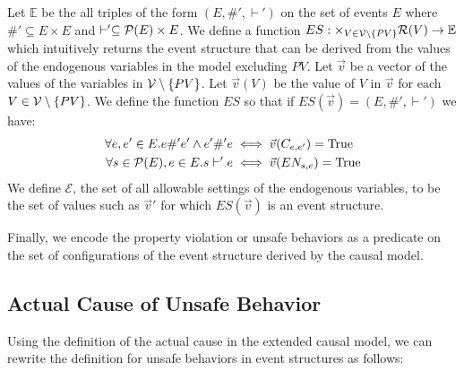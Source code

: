 Let $\mathbb{E}$ be the all triples of the form
$(E,\#',\vdash')$ on the set of events $E$ where
$\#' \subseteq E \times E$ and
$\vdash' \subseteq \mathcal{P}(E) \times E$.
We define a function
$ES: \times_{V \in \mathcal{V}\setminus \{PV\}} \mathcal{R}(V) \rightarrow \mathbb{E}$ which intuitively returns the event structure
that can be derived from the values of the endogenous variables
in the model excluding $PV$.
Let $\vec v$ be a vector of the values of the variables
in $\mathcal{V} \setminus \{PV\}$.
Let $\vec v(V)$ be the value of $V$ in $\vec v$ for each
$V \in \mathcal{V} \setminus \{PV\}$.
We define the function $ES$ so that if
$ES(\vec v) = (E,\#',\vdash')$ we have:
\begin{align*}
    \forall e,e' \in E. e \#' e' \wedge e' \#' e
     & \iff \vec{v}(C_{e,e'}) = \mathrm{True} \\
    \forall s \in \mathcal{P}(E), e \in E.  s \vdash' e
     & \iff \vec{v}(EN_{s,e}) = \mathrm{True}
\end{align*}
We define $\mathcal{E}$, the set of all allowable
settings of the endogenous variables, to be the set of
values such as $\vec v'$ for which $ES(\vec v)$ is an
event structure.

Finally, we encode the property violation or unsafe behaviors
as a predicate on the set of configurations of the
event structure derived by the causal model.

\subsection{Actual Cause of Unsafe Behavior}

Using the definition of the actual cause in the extended causal 
model, we can rewrite the definition for unsafe behaviors in 
event structures as follows:

